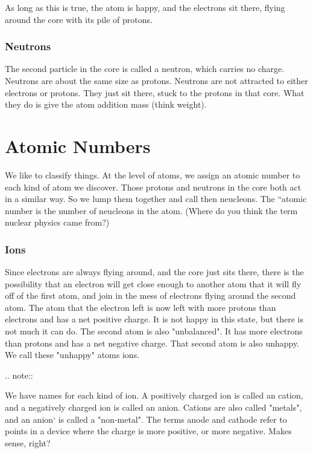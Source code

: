 As long as this is true, the atom is happy, and the electrons sit there, flying
around the core with its pile of protons.

\subsubsection{Neutrons}

The second particle in the core is called a neutron, which carries no
charge. Neutrons are about the same size as protons. Neutrons are
not attracted to either electrons or protons. They just sit there,
stuck to the protons in that core. What they do is give the atom addition
mass (think weight).

\section{Atomic Numbers}

We like to classify things. At the level of atoms, we assign an atomic
number to each kind of atom we discover. Those protons and neutrons
in the core both act in a similar way. So we lump them together and call
then neucleons. The ``atomic number is the number of neucleons in the
atom. (Where do you think the term nuclear physics came from?)

\subsubsection{Ions}

Since electrons are always flying around, and the core just sits there,
there is the possibility that an electron will get close enough to another atom
that it will fly off of the first atom, and join in the mess of electrons
flying around the second atom. The atom that the electron left is now left
with more protons than electrons and has a net positive charge. It
is not happy in this state, but there is not much it can do. The second atom is
also "unbalanced". It has more electrons than protons and has a net
negative charge. That second atom is also unhappy. We call these "unhappy"
atoms ions. 

..  note::

    We have names for each kind of ion. A positively charged ion is
    called an cation, and a negatively charged ion is called an
    anion. Cations are also called "metals", and an anion` is called a
    "non-metal". The terms anode and cathode refer to points in a
    device where the charge is more positive, or more negative. Makes sense,
    right?


